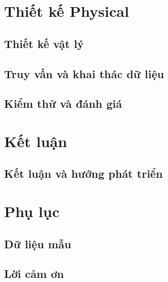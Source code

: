 \documentclass[letterpaper,11pt,leqno]{book}
\newcommand{\bib}{book.bib}
\begin{document}
\part{Thiết kế Physical}\label{p:physical}

\chapter{Thiết kế vật lý}\label{c:physical}


\chapter{Truy vấn và khai thác dữ liệu}\label{c:queries}


\chapter{Kiểm thử và đánh giá}\label{c:testing}


\part{Kết luận}\label{p:conclusion}

\chapter{Kết luận và hướng phát triển}\label{c:conclusion}


\appendix

\part{Phụ lục}\label{p:appendix}

\chapter{Dữ liệu mẫu}\label{a:data}


\backmatter
\nocite{*}


\chapter{Lời cảm ơn}


\printindex
\end{document}
